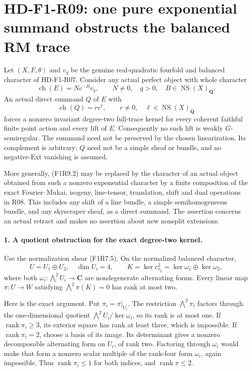\section[HD-F1-R09: pure-character retracts and the balanced RM trace]{HD-F1-R09: one pure exponential summand obstructs the balanced RM trace}
\label{sec:followup-rm-pure-summand}

Let $(X,F,\theta)$ and $v_q$ be the genuine real-quadratic fourfold
and balanced character of HD-F1-R07. Consider any actual perfect
object with whole character
\[
 \operatorname{ch}(E)=N e^{-B}v_q,\qquad
 N\ne0,\quad q>0,\quad B\in\operatorname{NS}(X)_{\mathbf Q}.
 \tag{F1R9.1}
\]
An actual direct summand $Q$ of $E$ with
\[
                 \operatorname{ch}(Q)=r e^\ell,\qquad
 r\ne0,\quad\ell\in\operatorname{NS}(X)_{\mathbf Q}
 \tag{F1R9.2}
\]
forces a nonzero invariant degree-two full-trace kernel for every
coherent faithful finite point action and every lift of $E$.
Consequently no such lift is weakly $G$-semiregular. The summand need
not be preserved by the chosen linearization. Its complement is
arbitrary; $Q$ need not be a simple sheaf or bundle, and no negative-Ext
vanishing is assumed.

More generally, (F1R9.2) may be replaced by the character of an actual
object obtained from such a nonzero exponential character by a finite
composition of the exact Fourier--Mukai, isogeny, line-tensor,
translation, shift and dual operations in R08. This includes any
shift of a line bundle, a simple semihomogeneous bundle, and any
skyscraper sheaf, as a direct summand. The assertion concerns an
actual retract and makes no assertion about new nonsplit extensions.

\paragraph{1. A quotient obstruction for the exact degree-two kernel.}
Use the normalization shear (F1R7.5). On the normalized balanced
character,
\[
 U=U_1\oplus U_2,\quad\dim U_i=4,\qquad
 K=\ker c_{v_q}^2=\ker\omega_1\oplus\ker\omega_2,
 \tag{F1R9.3}
\]
where both $\omega_i:\bigwedge^2U_i\to\mathbf C$ are nondegenerate
alternating forms. Every linear map $\pi:U\to W$ satisfying
$\bigwedge^2\pi(K)=0$ has rank at most two.

Here is the exact argument. Put $\pi_i=\pi|_{U_i}$. The restriction
$\bigwedge^2\pi_i$ factors through the one-dimensional quotient
$\bigwedge^2U_i/\ker\omega_i$, so its rank is at most one.
If $\operatorname{rank}\pi_i\ge3$, its exterior square has rank
at least three, which is impossible. If $\operatorname{rank}\pi_i=2$,
choose a basis of its image. Its determinant gives a nonzero
decomposable alternating form on $U_i$, of rank two. Factoring
through $\omega_i$ would make that form a nonzero scalar multiple
of the rank-four form $\omega_i$, again impossible. Thus
$\operatorname{rank}\pi_i\le1$ for both indices, and
$\operatorname{rank}\pi\le2$.

